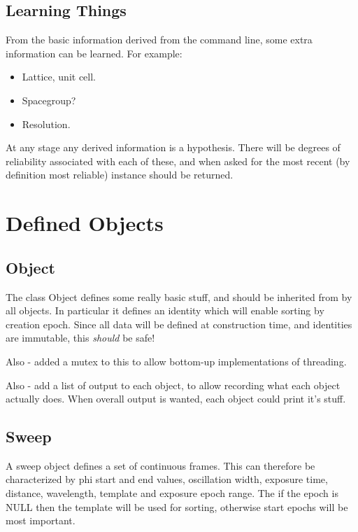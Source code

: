 \documentclass[a4paper, 11pt]{article}
\begin{document}
\subsection{Learning Things}

From the basic information derived from the command line, some extra 
information can be learned. For example:

\begin{itemize}
\item{Lattice, unit cell.}
\item{Spacegroup?}
\item{Resolution.}
\end{itemize}

At any stage any derived information is a hypothesis. There will be degrees
of reliability associated with each of these, and when asked for the most 
recent (by definition most reliable) instance should be returned.

\section{Defined Objects}

\subsection{Object}

The class Object defines some really basic stuff, and should be inherited 
from by all objects. In particular it defines an identity which will enable
sorting by creation epoch. Since all data will be defined at construction 
time, and identities are immutable, this \emph{should} be safe!

Also - added a mutex to this to allow bottom-up implementations of threading.

Also - add a list of output to each object, to allow recording what each
object actually does. When overall output is wanted, each object could print
it's stuff.

\subsection{Sweep}

A sweep object defines a set of continuous frames. This can therefore be
characterized by phi start and end values, oscillation width, exposure
time, distance, wavelength, template and exposure epoch range. The if the epoch
is NULL then the template will be used for sorting, otherwise start epochs
will be most important.
\end{document}
